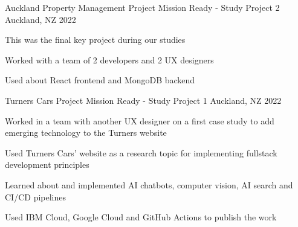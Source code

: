 \begin{cventries}
  \cventry
    {Auckland Property Management Project} %
    {Mission Ready - Study Project 2} %
    {Auckland, NZ} %
    {2022} %
    {
      \begin{cvitems} %
        \item {This was the final key project during our studies}
        \item {Worked with a team of 2 developers and 2 UX designers}
        \item {Used about React frontend and MongoDB backend}
      \end{cvitems}
    }

  \cventry
    {Turners Cars Project} %
    {Mission Ready - Study Project 1} %
    {Auckland, NZ} %
    {2022} %
    {
      \begin{cvitems} %
        \item {Worked in a team with another UX designer on a first case study to add emerging technology to the Turners website}
        \item {Used Turners Cars' website as a research topic for implementing fullstack development principles}
        \item {Learned about and implemented AI chatbots, computer vision, AI search and CI/CD pipelines}
        \item {Used IBM Cloud, Google Cloud and GitHub Actions to publish the work}
      \end{cvitems}
    }


\end{cventries}

